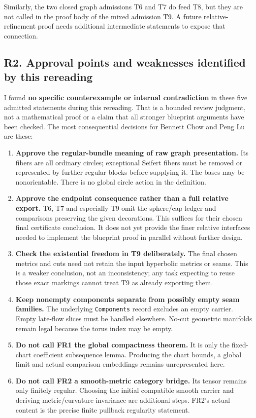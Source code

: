 \documentclass[
  letterpaper,
  11pt]{article}
\providecommand{\tightlist}{%
  \setlength{\itemsep}{0pt}\setlength{\parskip}{0pt}}
\begin{document}
Similarly, the two closed graph admissions T6 and T7 do feed T8, but
they are not called in the proof body of the mixed admission T9. A
future relative-refinement proof needs additional intermediate
statements to expose that connection.

\subsection{R2. Approval points and weaknesses identified by this
rereading}\label{topology-r2}

I found \textbf{no specific counterexample or internal contradiction} in
these five admitted statements during this rereading. That is a bounded
review judgment, not a mathematical proof or a claim that all stronger
blueprint arguments have been checked. The most consequential decisions
for Bennett Chow and Peng Lu are these:

\begin{enumerate}
\def\labelenumi{\arabic{enumi}.}
\tightlist
\item
  \textbf{Approve the regular-bundle meaning of raw graph presentation.}
  Its fibers are all ordinary circles; exceptional Seifert fibers must
  be removed or represented by further regular blocks before supplying
  it. The bases may be nonorientable. There is no global circle action
  in the definition.
\item
  \textbf{Approve the endpoint consequence rather than a full relative
  export.} T6, T7 and especially T9 omit the sphere/cap ledger and
  comparisons preserving the given decorations. This suffices for their
  chosen final certificate conclusion. It does not yet provide the finer
  relative interfaces needed to implement the blueprint proof in
  parallel without further design.
\item
  \textbf{Check the existential freedom in T9 deliberately.} The final
  chosen metrics and cuts need not retain the input hyperbolic metrics
  or seams. This is a weaker conclusion, not an inconsistency; any task
  expecting to reuse those exact markings cannot treat T9 as already
  exporting them.
\item
  \textbf{Keep nonempty components separate from possibly empty seam
  families.} The underlying {\small\texttt{Components}} record excludes
  an empty carrier. Empty late-flow slices must be handled elsewhere.
  No-cut geometric manifolds remain legal because the torus index may be
  empty.
\item
  \textbf{Do not call FR1 the global compactness theorem.} It is only
  the fixed-chart coefficient subsequence lemma. Producing the chart
  bounds, a global limit and actual comparison embeddings remains
  unrepresented here.
\item
  \textbf{Do not call FR2 a smooth-metric category bridge.} Its tensor
  remains only finitely regular. Choosing the initial compatible smooth
  carrier and deriving metric/curvature invariance are additional steps.
  FR2's actual content is the precise finite pullback regularity
  statement.
\end{enumerate}
\end{document}
